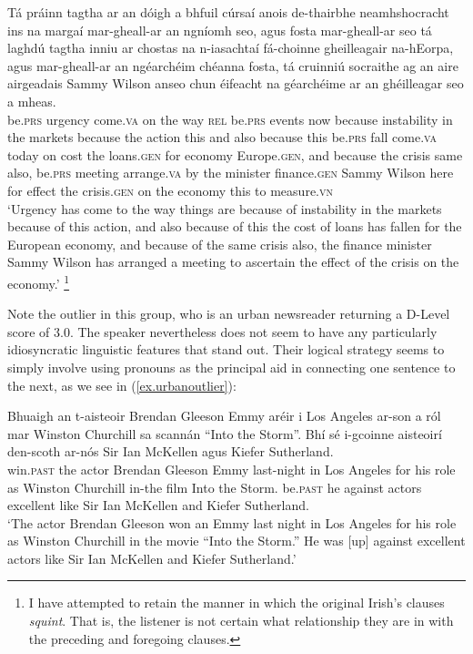 \documentclass[output=paper,colorlinks,citecolor=brown]{langscibook}
\begin{document}

\ea\label{ex.urbanstrings}
\gll Tá práinn tagtha ar an dóigh a bhfuil cúrsaí anois de-thairbhe neamhshocracht ins na margaí mar-gheall-ar an ngníomh seo, agus fosta mar-gheall-ar seo tá laghdú tagtha inniu ar chostas na n-iasachtaí fá-choinne gheilleagair na-hEorpa, agus mar-gheall-ar an ngéarchéim chéanna fosta, tá cruinniú socraithe ag an aire airgeadais Sammy Wilson anseo chun éifeacht na géarchéime ar an ghéilleagar seo a mheas.\\
be.\textsc{prs} urgency come.\textsc{va} on the way \textsc{rel} be.\textsc{prs} events now because instability in the markets because the action this and also because this be.\textsc{prs} fall come.\textsc{va} today on cost the loans.\textsc{gen} for economy Europe.\textsc{gen}, and because the crisis same also, be.\textsc{prs} meeting arrange.\textsc{va} by the minister finance.\textsc{gen} Sammy Wilson here for effect the crisis.\textsc{gen} on the economy this to measure.\textsc{vn} \\
\glt ‘Urgency has come to the way things are because of instability in the markets because of this action, and also because of this the cost of loans has fallen for the European economy, and because of the same crisis also, the finance minister Sammy Wilson has arranged a meeting to ascertain the effect of the crisis on the economy.' \footnote{I have attempted to retain the manner in which the original Irish's clauses \textit{squint}. That is, the listener is not certain what relationship they are in with the preceding and foregoing clauses.}
\z

Note the outlier in this group, who is an urban newsreader returning a D-Level score of 3.0. The speaker nevertheless does not seem to have any particularly idiosyncratic linguistic features that stand out. Their logical strategy seems to simply involve using pronouns as the principal aid in connecting one sentence to the next, as we see in (\ref{ex.urbanoutlier}):

\ea\label{ex.urbanoutlier}
\gll Bhuaigh an t-aisteoir Brendan Gleeson Emmy aréir i Los Angeles ar-son a ról mar Winston Churchill sa scannán “Into the Storm”. Bhí sé i-gcoinne aisteoirí den-scoth ar-nós Sir Ian McKellen agus Kiefer Sutherland.\\
win.\textsc{past} the actor Brendan Gleeson Emmy last-night in Los Angeles for his role as Winston Churchill in-the film Into the Storm. be.\textsc{past} he against actors excellent like Sir Ian McKellen and Kiefer Sutherland.\\
\glt ‘The actor Brendan Gleeson won an Emmy last night in Los Angeles for his role as Winston Churchill in the movie “Into the Storm.” He was [up] against excellent actors like Sir Ian McKellen and Kiefer Sutherland.’
\z
\end{document}
